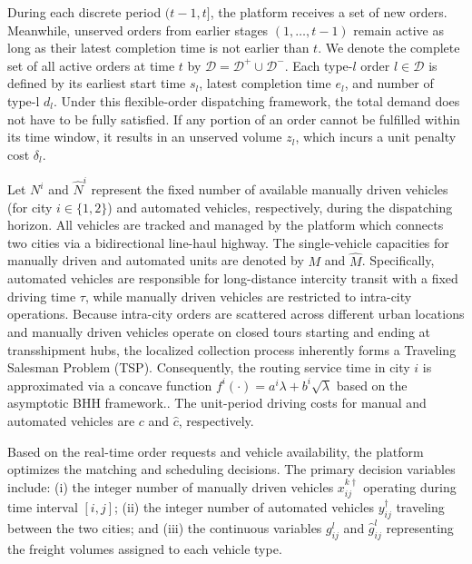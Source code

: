 \documentclass[10pt, reqno]{amsart}
\begin{document}
During each discrete period $(t-1, t]$, the platform receives a set of new orders. Meanwhile, unserved orders from earlier stages $(1, \dots, t-1)$ remain active as long as their latest completion time is not earlier than $t$. We denote the complete set of all active orders at time $t$ by $\mathcal{D} = \mathcal{D}^+ \cup \mathcal{D}^-$. Each type-$l$ order $l \in \mathcal{D}$ is defined by its earliest start time $s_l$, latest completion time $e_l$, and number of type-l $d_l$. Under this flexible-order dispatching framework, the total demand does not have to be fully satisfied. If any portion of an order cannot be fulfilled within its time window, it results in an unserved volume $z_l$, which incurs a unit penalty cost $\delta_l$.    

Let $N^i$ and $\hat{N}^i$ represent the fixed number of available manually driven vehicles (for city $i \in \{1,2\}$) and automated vehicles, respectively, during the dispatching horizon. All vehicles are tracked and managed by the platform which connects two cities via a bidirectional line-haul highway. The single-vehicle capacities for manually driven and automated units are denoted by $M$ and $\hat{M}$. Specifically, automated vehicles are responsible for long-distance intercity transit with a fixed driving time $\tau$, while manually driven vehicles are restricted to intra-city operations. Because intra-city orders are scattered across different urban locations and manually driven vehicles operate on closed tours starting and ending at transshipment hubs, the localized collection process inherently forms a Traveling Salesman Problem (TSP). Consequently, the routing service time in city $i$ is approximated via a concave function $f^i(\cdot)=a^i\lambda+b^i\sqrt{\lambda}$ based on the asymptotic BHH framework.\cite{Beardwood1959Shortest}. The unit-period driving costs for manual and automated vehicles are $c$ and $\hat{c}$, respectively.

Based on the real-time order requests and vehicle availability, the platform optimizes the matching and scheduling decisions. The primary decision variables include: (i) the integer number of manually driven vehicles $x_{ij}^{k\dagger}$ operating during time interval $[i, j]$; (ii) the integer number of automated vehicles $y_{ij}^{\dagger}$ traveling between the two cities; and (iii) the continuous variables $g_{ij}^{l}$ and $\hat{g}_{ij}^{l}$ representing the freight volumes assigned to each vehicle type. 
\end{document}
